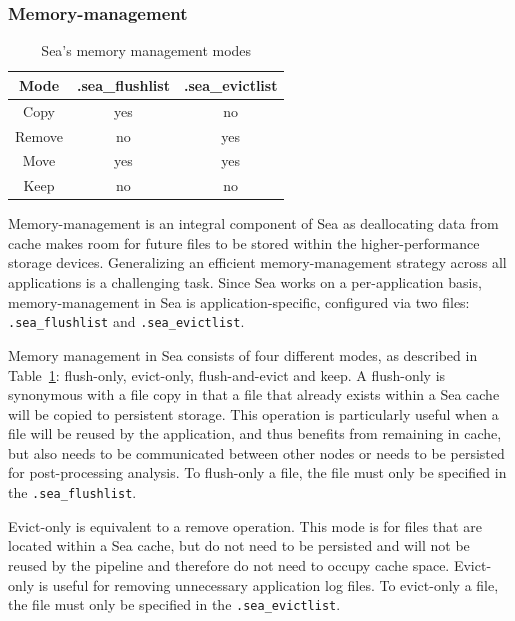 \documentclass[10pt,journal,compsoc]{IEEEtran}
\newcommand{\todo}[1]{\marginpar{\parbox{18mm}{\flushleft\tiny\color{red}\textbf{TODO}:
#1}}}
\begin{document}
\subsubsection{Memory-management}
      \begin{table}
      \centering
      \begin{tabular}{ccc}
        \toprule
       Mode & .sea\_flushlist & .sea\_evictlist \\
       \midrule
       Copy & yes & no \\
       Remove & no & yes \\
       Move & yes & yes \\
       Keep & no & no \\

       \bottomrule

      \end{tabular}
      \caption{Sea's memory management modes}
      \label{table:sea-comp:fe}
      \end{table}
Memory-management is an integral component of Sea as deallocating data from cache
makes room for future files to be stored within the higher-performance storage devices.
Generalizing an efficient memory-management strategy across all applications is a challenging task.
Since Sea works on a per-application basis, memory-management in Sea is application-specific, configured
via two files: \texttt{.sea\_flushlist} and \texttt{.sea\_evictlist}.

Memory management in Sea consists of four different modes, as described in Table~\ref{table:sea-comp:fe}: flush-only,
evict-only, flush-and-evict and keep. A flush-only is synonymous with a file
copy in that a file that already exists within a Sea cache will be copied to
persistent storage. This operation is particularly useful when a file will be
reused by the application, and thus benefits from remaining in cache, but also
needs to be communicated between other nodes or needs to be persisted for
post-processing analysis. To flush-only a file, the file must only be specified
in the \texttt{.sea\_flushlist}.

Evict-only is equivalent to a remove operation. This mode is for files that are
located within a Sea cache, but do not need to be persisted and will not be
reused by the pipeline and therefore do not need to occupy cache space.
Evict-only is useful for removing unnecessary application log files. To
evict-only a file, the file must only be specified in the
\texttt{.sea\_evictlist}.
\end{document}
